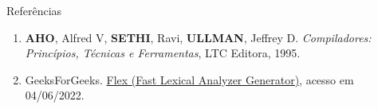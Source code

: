 \begin{frame}[fragile]{Referências}

    \begin{enumerate}
        \item \textbf{AHO}, Alfred V, \textbf{SETHI}, Ravi, \textbf{ULLMAN}, Jeffrey D. \textit{Compiladores: Princípios, Técnicas e Ferramentas}, LTC Editora, 1995.

        \item GeeksForGeeks. \href{https://www.geeksforgeeks.org/flex-fast-lexical-analyzer-generator/}{Flex (Fast Lexical Analyzer Generator)}, acesso em 
            04/06/2022.

    \end{enumerate}

\end{frame}

